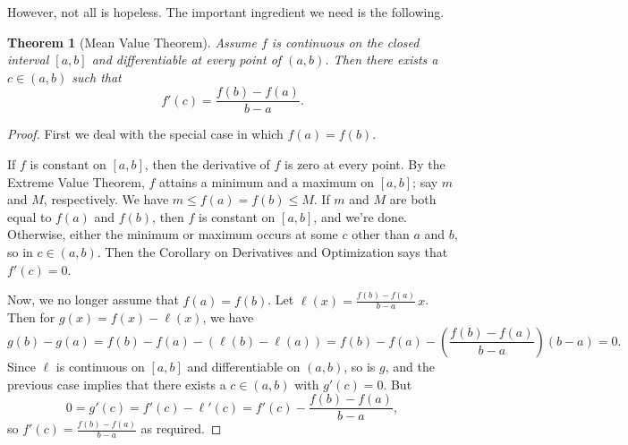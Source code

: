 \documentclass[12pt]{amsart}
\numberwithin{equation}{section}
\theoremstyle{plain} %
\newtheorem{thm}[equation]{Theorem}
\theoremstyle{definition}
\theoremstyle{remark}
\begin{document}
However, not all is hopeless. The important ingredient we need is the following.


\begin{thm}[Mean Value Theorem] Assume $f$ is continuous on the closed interval $[a,b]$ and differentiable at every point of $(a,b)$. Then there exists a $c \in
  (a,b)$ such that 
$$
f'(c) = \frac{f(b) - f(a)}{b-a}.
$$
\end{thm}
\begin{proof}
First we deal with the special case in which $f(a) = f(b)$.

If $f$ is constant on $[a,b]$, then the derivative of $f$ is zero at every point. By the Extreme Value Theorem, $f$ attains a minimum and a maximum on $[a,b]$; say $m$ and $M$, respectively. We have $m \leq f(a) = f(b) \leq M$. If $m$ and $M$ are both equal to $f(a)$ and $f(b)$, then $f$ is constant on $[a,b]$, and we're done. Otherwise, either the minimum or maximum occurs at some $c$  other than $a$ and $b$, so in $c\in (a,b)$. Then the Corollary on Derivatives and Optimization says that $f'(c)=0$.

Now, we no longer assume that $f(a)=f(b)$. Let $\ell(x) = \frac{f(b) - f(a)}{b-a}\, x$. Then for $g(x) = f(x) - \ell(x)$, we have \[ g(b) - g(a) = f(b) - f(a) - (\ell(b) -\ell(a)) = f(b)-f(a) - (\frac{f(b) - f(a)}{b-a})(b-a) = 0.\]
Since $\ell$ is continuous on $[a,b]$ and differentiable on $(a,b)$, so is $g$, and the previous case implies that there exists a $c\in (a,b)$ with $g'(c)=0$. But \[0=g'(c) = f'(c) - \ell'(c) = f'(c) - \frac{f(b) - f(a)}{b-a},\]
so $f'(c) = \frac{f(b) - f(a)}{b-a}$ as required.
\end{proof}
\end{document}
